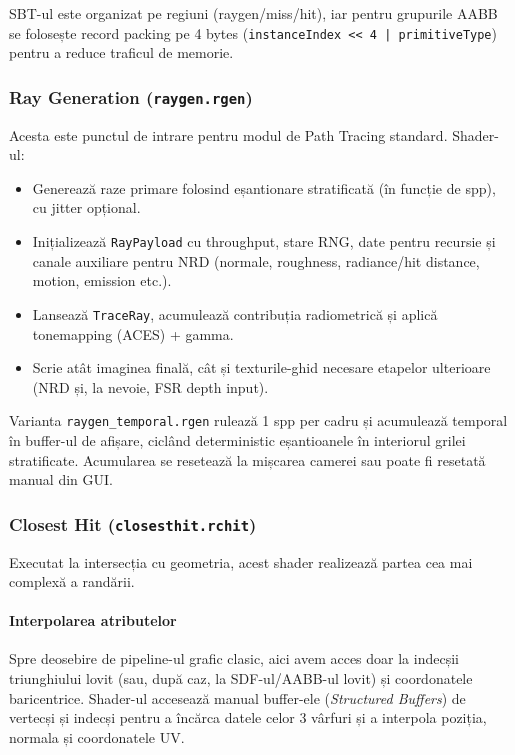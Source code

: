 \documentclass[12pt,a4paper]{report}
\numberwithin{equation}{section} %
\begin{document}
SBT-ul este organizat pe regiuni (raygen/miss/hit), iar pentru grupurile AABB se folosește record packing pe 4 bytes (\texttt{instanceIndex << 4 | primitiveType}) pentru a reduce traficul de memorie.

\subsubsection{Ray Generation (\texttt{raygen.rgen})}

Acesta este punctul de intrare pentru modul de Path Tracing standard.
Shader-ul:
\begin{itemize}
    \item Generează raze primare folosind eșantionare stratificată (în funcție de spp), cu jitter opțional.
    \item Inițializează \texttt{RayPayload} cu throughput, stare RNG, date pentru recursie și canale auxiliare pentru NRD (normale, roughness, radiance/hit distance, motion, emission etc.).
    \item Lansează \texttt{TraceRay}, acumulează contribuția radiometrică și aplică tonemapping (ACES) + gamma.
    \item Scrie atât imaginea finală, cât și texturile-ghid necesare etapelor ulterioare (NRD și, la nevoie, FSR depth input).
\end{itemize}

Varianta \texttt{raygen\_temporal.rgen} rulează 1 spp per cadru și acumulează temporal în buffer-ul de afișare, ciclând deterministic eșantioanele în interiorul grilei stratificate.
Acumularea se resetează la mișcarea camerei sau poate fi resetată manual din GUI.

\subsubsection{Closest Hit (\texttt{closesthit.rchit})}

Executat la intersecția cu geometria, acest shader realizează partea cea mai complexă a randării.

\paragraph{Interpolarea atributelor}
Spre deosebire de pipeline-ul grafic clasic, aici avem acces doar la indecșii triunghiului lovit (sau, după caz, la SDF-ul/AABB-ul lovit) și coordonatele baricentrice.
Shader-ul accesează manual buffer-ele (\textit{Structured Buffers}) de vertecși și indecși pentru a încărca datele celor 3 vârfuri și a interpola poziția, normala și coordonatele UV.
\end{document}
